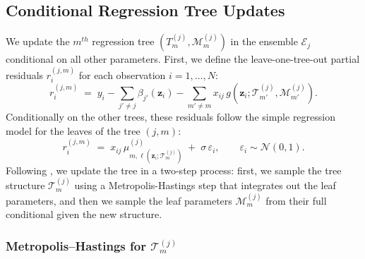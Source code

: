 \documentclass[11pt]{article}
\newcommand{\calM}{\mathcal{M}}
\newcommand{\calT}{\mathcal{T}}
\newcommand{\bz}{\bm{z}}
\theoremstyle{plain}
\theoremstyle{definition}
\theoremstyle{plain}
\begin{document}
\subsection*{Conditional Regression Tree Updates}
We update the $m^{th}$ regression tree $(T_m^{(j)}, \mathcal{M}_m^{(j)})$ in the ensemble $\mathcal{E}_j$ conditional on all other parameters. First, we define the leave-one-tree-out partial residuals $r_i^{(j,m)}$ for each observation $i=1,\dots,N$:
\begin{equation}
\label{eqS:partialres}
r_i^{(j,m)} \;=\; y_i
- \sum_{j'\neq j}\beta_{j'}(\bz_i)
- \sum_{m'\neq m} x_{ij}\, g(\bz_i;\calT^{(j)}_{m'},\calM^{(j)}_{m'}).
\end{equation}
Conditionally on the other trees, these residuals follow the simple regression model for the leaves of the tree $(j,m)$:
\begin{equation}
\label{eqS:leaflike}
r_i^{(j,m)} \;=\; x_{ij}\,\mu^{(j)}_{m,\ell(\bz_i;\calT^{(j)}_m)} \;+\; \sigma\,\varepsilon_i,\qquad \varepsilon_i\sim\mathcal N(0,1).
\end{equation}
Following \citet{Chipman2010}, we update the tree in a two-step process: first, we sample the tree structure $\mathcal{T}_m^{(j)}$ using a Metropolis-Hastings step that integrates out the leaf parameters, and then we sample the leaf parameters $\mathcal{M}_m^{(j)}$ from their full conditional given the new structure.

\subsubsection*{Metropolis--Hastings for $\calT^{(j)}_m$}
\end{document}
